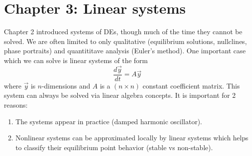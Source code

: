 \documentclass{article}
\begin{document}
\section{Chapter 3: Linear systems}

Chapter 2 introduced systems of DEs, though much of the time they cannot be solved. We are often limited to only qualitative (equilibrium solutions, nullclines, phase portraits) and quantititave analysis (Euler's method). One important case which we can solve is linear systems of the form
\[
\frac{d \vec{y}}{dt} = A \vec{y}
\]
where $\vec{y}$ is $n$-dimensions and $A$ is a $(n\times n)$ constant coefficient matrix. This system can always be solved via linear algebra concepts. It is important for 2 reasons:
\begin{enumerate}
\item The systems appear in practice (damped harmonic oscillator).
\item Nonlinear systems can be approximated locally by linear systems which helps to classify their equilibrium point behavior (stable vs non-stable).
\end{enumerate}
\end{document}

